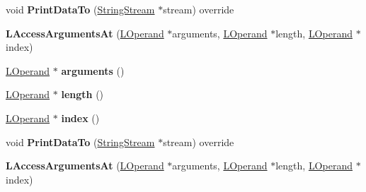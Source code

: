 \begin{DoxyCompactItemize}
\item 
void {\bfseries Print\+Data\+To} (\hyperlink{classv8_1_1internal_1_1_string_stream}{String\+Stream} $\ast$stream) override\hypertarget{classv8_1_1internal_1_1_l_access_arguments_at_a3027cb02e655a31d8f9264d10b49c7be}{}\label{classv8_1_1internal_1_1_l_access_arguments_at_a3027cb02e655a31d8f9264d10b49c7be}

\item 
{\bfseries L\+Access\+Arguments\+At} (\hyperlink{classv8_1_1internal_1_1_l_operand}{L\+Operand} $\ast$arguments, \hyperlink{classv8_1_1internal_1_1_l_operand}{L\+Operand} $\ast$length, \hyperlink{classv8_1_1internal_1_1_l_operand}{L\+Operand} $\ast$index)\hypertarget{classv8_1_1internal_1_1_l_access_arguments_at_a8b3a736e564c8f5337bf40bebffae277}{}\label{classv8_1_1internal_1_1_l_access_arguments_at_a8b3a736e564c8f5337bf40bebffae277}

\item 
\hyperlink{classv8_1_1internal_1_1_l_operand}{L\+Operand} $\ast$ {\bfseries arguments} ()\hypertarget{classv8_1_1internal_1_1_l_access_arguments_at_a54eb42639fc35df69b3a3f57d7042ffd}{}\label{classv8_1_1internal_1_1_l_access_arguments_at_a54eb42639fc35df69b3a3f57d7042ffd}

\item 
\hyperlink{classv8_1_1internal_1_1_l_operand}{L\+Operand} $\ast$ {\bfseries length} ()\hypertarget{classv8_1_1internal_1_1_l_access_arguments_at_aca767dd582bd23265453d015e4cb3174}{}\label{classv8_1_1internal_1_1_l_access_arguments_at_aca767dd582bd23265453d015e4cb3174}

\item 
\hyperlink{classv8_1_1internal_1_1_l_operand}{L\+Operand} $\ast$ {\bfseries index} ()\hypertarget{classv8_1_1internal_1_1_l_access_arguments_at_a6d772ab178a18a50a3fa64dee0cab4c7}{}\label{classv8_1_1internal_1_1_l_access_arguments_at_a6d772ab178a18a50a3fa64dee0cab4c7}

\item 
void {\bfseries Print\+Data\+To} (\hyperlink{classv8_1_1internal_1_1_string_stream}{String\+Stream} $\ast$stream) override\hypertarget{classv8_1_1internal_1_1_l_access_arguments_at_a3027cb02e655a31d8f9264d10b49c7be}{}\label{classv8_1_1internal_1_1_l_access_arguments_at_a3027cb02e655a31d8f9264d10b49c7be}

\item 
{\bfseries L\+Access\+Arguments\+At} (\hyperlink{classv8_1_1internal_1_1_l_operand}{L\+Operand} $\ast$arguments, \hyperlink{classv8_1_1internal_1_1_l_operand}{L\+Operand} $\ast$length, \hyperlink{classv8_1_1internal_1_1_l_operand}{L\+Operand} $\ast$index)\hypertarget{classv8_1_1internal_1_1_l_access_arguments_at_a8b3a736e564c8f5337bf40bebffae277}{}\label{classv8_1_1internal_1_1_l_access_arguments_at_a8b3a736e564c8f5337bf40bebffae277}


\end{DoxyCompactItemize}
